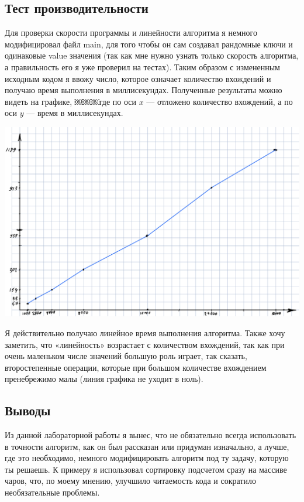 \documentclass[12pt]{article}
\begin{document}
\subsection*{Тест производительности}
Для проверки скорости программы и линейности алгоритма я немного модифицировал файл main, для того чтобы он сам создавал рандомные ключи и одинаковые value значения (так как мне нужно узнать только скорость алгоритма, а правильность его я уже проверил на тестах). Таким образом с измененным исходным кодом я ввожу число, которое означает количество вхождений и получаю время выполнения в миллисекундах. Полученные результаты можно видеть на графике, ￼￼￼где по оси $x$ — отложено количество вхождений, а по оси $y$ — время в миллисекундах.

\includegraphics[width=\linewidth]{Graph}

Я действительно получаю линейное время выполнения алгоритма. Также хочу заметить, что «линейность» возрастает с количеством вхождений, так как при очень маленьком числе значений большую роль играет, так сказать, второстепенные операции, которые при большом количестве вхождением  пренебрежимо малы (линия графика не уходит в ноль).

\subsection*{Выводы}

Из данной лабораторной работы я вынес, что не обязательно всегда использовать в точности алгоритм, как он был рассказан или придуман изначально, а лучше, где это необходимо, немного модифицировать алгоритм под ту задачу, которую ты решаешь. К примеру я использовал сортировку подсчетом сразу на массиве чаров, что, по моему мнению, улучшило читаемость кода и сократило необязательные проблемы.
\end{document}
